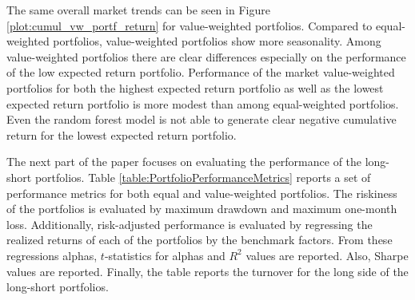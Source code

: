 \documentclass[12pt]{article}
\begin{document}
The same overall market trends can be seen in Figure \ref{plot:cumul_vw_portf_return} for value-weighted portfolios. Compared to equal-weighted portfolios, value-weighted portfolios show more seasonality. Among value-weighted portfolios there are clear differences especially on the performance of the low expected return portfolio. Performance of the market value-weighted portfolios for both the highest expected return portfolio as well as the lowest expected return portfolio is more modest than among equal-weighted portfolios. Even the random forest model is not able to generate clear negative cumulative return for the lowest expected return portfolio. \par

The next part of the paper focuses on evaluating the performance of the long-short portfolios. Table \ref{table:PortfolioPerformanceMetrics} reports a set of performance metrics for both equal and value-weighted portfolios. The riskiness of the portfolios is evaluated by maximum drawdown and maximum one-month loss. Additionally, risk-adjusted performance is evaluated by regressing the realized returns of each of the portfolios by the benchmark factors. From these regressions alphas, $t$-statistics for alphas and $R^2$ values are reported. Also, Sharpe values are reported. Finally, the table reports the turnover for the long side of the long-short portfolios. \par
\end{document}
